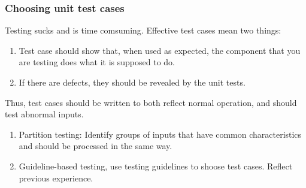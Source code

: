 \documentclass{article}
\begin{document}
\subsubsection{Choosing unit test cases}
Testing sucks and is time comsuming.  Effective test cases mean two things:
\begin{enumerate}
    \item Test case should show that, when used as expected, the component that you are testing does what it is supposed to do.
    \item If there are defects, they should be revealed by the unit tests.
\end{enumerate}
Thus, test cases should be written to both reflect normal operation, and should test abnormal inputs.
\begin{enumerate}
    \item Partition testing:  Identify groups of inputs that have common characteristics and should be processed in the same way.
    \item Guideline-based testing, use testing guidelines to shoose test cases.  Reflect previous experience.
\end{enumerate}
\end{document}
